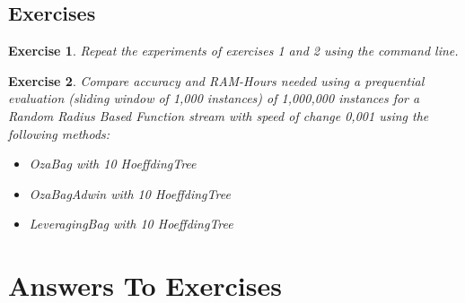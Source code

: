 \documentclass[a4paper,12pt]{article}
\newtheorem{exercise}{Exercise}{}
\begin{document}
\subsection{Exercises}
\begin{exercise}
Repeat the experiments of exercises 1 and 2 using the command line.  
\end{exercise}

\begin{exercise}
Compare accuracy and RAM-Hours needed using a prequential evaluation (sliding window of 1,000 instances) of 1,000,000 instances for a Random Radius Based Function stream with speed of change 0,001 using the following methods:
\begin{itemize}
 \item OzaBag with 10 HoeffdingTree
 \item OzaBagAdwin with 10 HoeffdingTree
 \item LeveragingBag with 10 HoeffdingTree
\end{itemize}
\end{exercise}


\section{Answers To Exercises}
\end{document}
